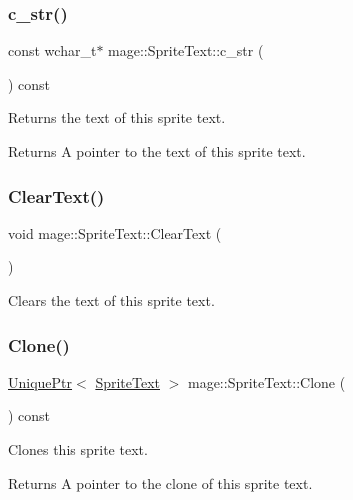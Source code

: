\subsubsection{\texorpdfstring{c\+\_\+str()}{c\_str()}}
{\footnotesize\ttfamily const wchar\+\_\+t$\ast$ mage\+::\+Sprite\+Text\+::c\+\_\+str (\begin{DoxyParamCaption}{ }\end{DoxyParamCaption}) const\hspace{0.3cm}{\ttfamily [noexcept]}}

Returns the text of this sprite text.

\begin{DoxyReturn}{Returns}
A pointer to the text of this sprite text. 
\end{DoxyReturn}
\hypertarget{classmage_1_1_sprite_text_a73c5a10e846e94f2f79a25a78bf2e6d0}{}\label{classmage_1_1_sprite_text_a73c5a10e846e94f2f79a25a78bf2e6d0} 
\subsubsection{\texorpdfstring{Clear\+Text()}{ClearText()}}
{\footnotesize\ttfamily void mage\+::\+Sprite\+Text\+::\+Clear\+Text (\begin{DoxyParamCaption}{ }\end{DoxyParamCaption})}

Clears the text of this sprite text. \hypertarget{classmage_1_1_sprite_text_ad76e6d91e59f5070152104da8af1aa4e}{}\label{classmage_1_1_sprite_text_ad76e6d91e59f5070152104da8af1aa4e} 
\subsubsection{\texorpdfstring{Clone()}{Clone()}}
{\footnotesize\ttfamily \hyperlink{namespacemage_a3316d7143a973e37adf1110f2e80ca31}{Unique\+Ptr}$<$ \hyperlink{classmage_1_1_sprite_text}{Sprite\+Text} $>$ mage\+::\+Sprite\+Text\+::\+Clone (\begin{DoxyParamCaption}{ }\end{DoxyParamCaption}) const}

Clones this sprite text.

\begin{DoxyReturn}{Returns}
A pointer to the clone of this sprite text. 
\end{DoxyReturn}
\hypertarget{classmage_1_1_sprite_text_aa2c63346f5ad7f63f7a6d474df3556ef}{}\label{classmage_1_1_sprite_text_aa2c63346f5ad7f63f7a6d474df3556ef} 
